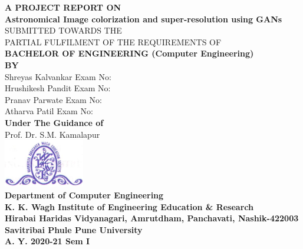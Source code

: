 \documentclass[oneside,a4paper,12pt]{report}
\begin{document}
\setlength{\parindent}{0mm}
\begin{center}
{\bfseries A  PROJECT REPORT ON \\}
 \vspace*{2\baselineskip}
{\bfseries \fontsize{16}{12} \selectfont Astronomical Image colorization and super-resolution using GANs \\ \vspace*{2\baselineskip}}
{\fontsize{12}{12} \selectfont SUBMITTED TOWARDS THE
 \\PARTIAL FULFILMENT OF THE REQUIREMENTS OF \\

\vspace*{2\baselineskip}}
{\bfseries \fontsize{14}{12} \selectfont BACHELOR OF ENGINEERING (Computer
Engineering) \\
\vspace*{1\baselineskip}}
{\bfseries \fontsize{14}{12} \selectfont BY \\
\vspace*{1\baselineskip}}
Shreyas Kalvankar  \hspace{25 mm} Exam No:  \\
Hrushikesh Pandit \hspace{25 mm} Exam No:   \\
Pranav Parwate \hspace{30 mm} Exam No:  \\
Atharva Patil \hspace{34 mm} Exam No:\\
\vspace*{2\baselineskip}
{\bfseries \fontsize{14}{12} \selectfont Under The Guidance of \\
\vspace*{2\baselineskip}}
Prof. Dr. S.M. Kamalapur\\
\includegraphics[width=100pt]{collegelogo.png} \\
{\bfseries \fontsize{14}{12} \selectfont Department of Computer Engineering \\
K. K. Wagh Institute of Engineering Education \& Research \\
Hirabai Haridas Vidyanagari, Amrutdham, Panchavati, Nashik-422003 \\
Savitribai Phule Pune University\\
A. Y. 2020-21 Sem I
}
\end{center}
\end{document}
